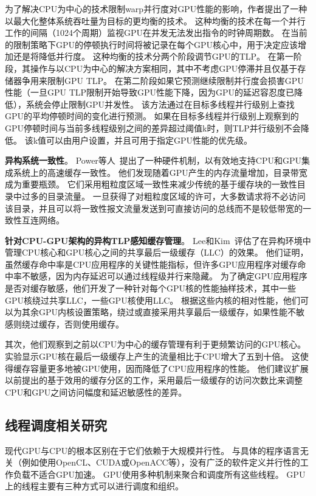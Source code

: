 为了解决CPU为中心的技术限制warp并行度对GPU性能的影响，作者提出了一种以最大化整体系统吞吐量为目标的更均衡的技术。
这种均衡的技术在每一个并行工作的间隔（1024个周期）监视GPU在并发无法发出指令的时钟周期数。
在当前的限制策略下GPU的停顿执行时间将被记录在每个GPU核心中，用于决定应该增加还是将降低并行度。
这种均衡的技术分两个阶段调节GPU的TLP。
在第一阶段，其操作与以CPU为中心的解决方案相同，其中不考虑GPU停滞并且仅基于存储器争用来限制GPU TLP。
在第二阶段如果它预测继续限制并行度会损害GPU性能（一旦GPU TLP限制开始导致GPU性能下降，因为GPU的延迟容忍度已降低），系统会停止限制GPU并发性。
该方法通过在目标多线程并行级别上查找GPU的平均停顿时间的变化进行预测。
如果在目标多线程并行级别上观察到的GPU停顿时间与当前多线程级别之间的差异超过阈值k时，则TLP并行级别不会降低。
该k值可以由用户设置，并且可用于指定GPU性能的优先级。

\textbf{异构系统一致性}。
Power等人~提出了一种硬件机制，以有效地支持CPU和GPU集成系统上的高速缓存一致性。
他们发现随着GPU产生的内存流量增加，目录带宽成为重要瓶颈。
它们采用粗粒度区域一致性来减少传统的基于缓存块的一致性目录中过多的目录流量。 
一旦获得了对粗粒度区域的许可，大多数请求将不必访问该目录，并且可以将一致性报文流量发送到可直接访问的总线而不是较低带宽的一致性互连网络。

\textbf{针对CPU-GPU架构的异构TLP感知缓存管理}。
Lee和Kim~评估了在异构环境中管理CPU核心和GPU核心之间的共享最后一级缓存（LLC）的效果。
他们证明，虽然缓存命中率是CPU应用程序的关键性能指标，但许多GPU应用程序对缓存命中率不敏感，因为内存延迟可以通过线程级并行来隐藏。
为了确定GPU应用程序是否对缓存敏感，他们开发了一种针对每个GPU核的性能抽样技术，其中一些GPU核绕过共享LLC，一些GPU核使用LLC。
根据这些内核的相对性能，他们可以为其余GPU内核设置策略，绕过或直接采用共享最后一级缓存，如果性能不敏感则绕过缓存，否则使用缓存。

其次，他们观察到之前以CPU为中心的缓存管理有利于更频繁访问的GPU核心。
实验显示GPU核在最后一级缓存上产生的流量相比于CPU增大了五到十倍。
这使得缓存容量更多地被GPU使用，因而降低了CPU应用程序的性能。
他们建议扩展以前提出的基于效用的缓存分区的工作，采用最后一级缓存的访问次数比来调整CPU和GPU之间访问幅度和延迟敏感性的差异。

\subsection{线程调度相关研究}
现代GPU与CPU的根本区别在于它们依赖于大规模并行性。 与具体的程序语言无关（例如使用OpenCL、CUDA或OpenACC等），没有广泛的软件定义并行性的工作负载不适合GPU加速。 
GPU使用多种机制来聚合和调度所有这些线程。 
GPU上的线程主要有三种方式可以进行调度和组织。

